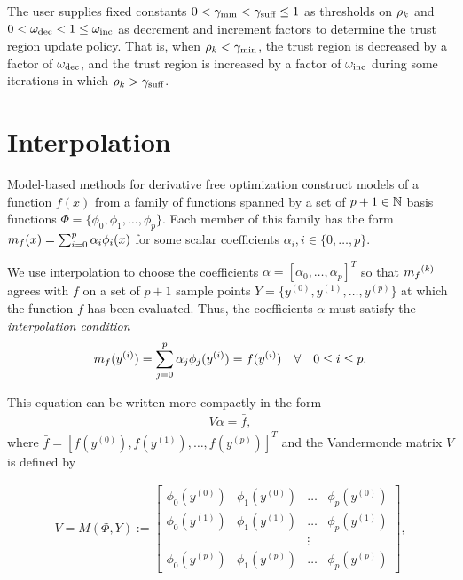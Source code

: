 The user supplies fixed constants
$
0 < \gamma_{\textrm{min}} < \gamma_{\textrm{suff}} \le 1
$
as thresholds on $\rho_k$ and
$
0 < \omega_{\text{dec}} < 1 \le \omega_{\text{inc}}
$
as decrement and increment factors to determine the trust region update policy.
That is, when $\rho_k < \gamma_{\textrm{min}}$, the trust region is decreased by a factor of $\omega_{\text{dec}}$, and the trust region is increased by a factor of $\omega_{\text{inc}}$
during some iterations in which $\rho_k > \gamma_{\textrm{suff}}$.


\section{Interpolation}
\label{interpolation} 
Model-based methods for derivative free optimization construct models of a function $f(x)$ from a family of functions spanned by a set of $p + 1 \in \mathbb N$ basis functions  $\Phi = \{\phi_0, \phi_1, \ldots, \phi_p\}$. Each member of this family has the form ${{m}_f}(x) = \sum_{i=0}^p\alpha_i\phi_i(x)$ for some scalar coefficients $\alpha_i, i \in \{0, \ldots, p\}$.

We use interpolation to choose the coefficients $\alpha = [\alpha_0, \ldots, \alpha_p]^T$ so that ${{m}_f}^{(k)}$ agrees with $f$ on a set of $p+1$ sample points $Y = \{y^{(0)}, y^{(1)}, \ldots, y^{(p)}\}$ at which the function $f$ has been evaluated.
Thus, the coefficients $\alpha$ must satisfy the \emph{interpolation condition}
\begin{align}
\label{interpolation_condition}
{{m}_f}(y^{(i)}) = \sum^p_{j=0}\alpha_j\phi_j(y^{(i)}) = f(y^{(i)}) \quad \forall \quad 0 \le i \le p.
\end{align}

This equation can be written more compactly in the form
\begin{align}
\label{matrix_form}
V \alpha = \bar{f},
\end{align}
where $\bar{f} = [f(y^{(0)}), f(y^{(1)}), \ldots, f(y^{(p)})]^T$ and the Vandermonde matrix $V$ is defined by 

\begin{align}
\label{vandermonde}
V=M(\Phi,Y) :=
\begin{bmatrix}
    \phi_0(y^{(0)})      & \phi_1(y^{(0)})       & \ldots & \phi_{p}(y^{(0)})      \\
    \phi_0(y^{(1)})      & \phi_1(y^{(1)})       & \dots  & \phi_{p}(y^{(1)})      \\
                     &                   & \vdots &                    \\
    \phi_0(y^{(p)})    & \phi_1(y^{(p)})     & \ldots & \phi_{p}(y^{{(p)}})
\end{bmatrix},
\end{align}


